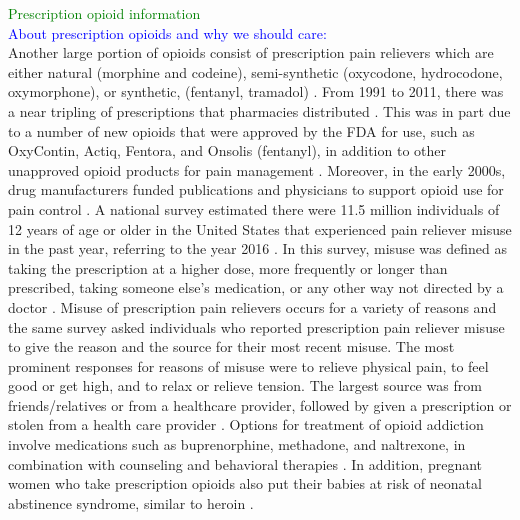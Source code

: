 \documentclass[12pt]{article}
\begin{document}
\textcolor{green}{Prescription opioid information} \\
\textcolor{blue}{About prescription opioids and why we should care:} \\
Another large portion of opioids consist of prescription pain relievers which are either natural (morphine and codeine), semi-synthetic (oxycodone, hydrocodone, oxymorphone), or synthetic, (fentanyl, tramadol) \cite{CDC3, TNMentalHealth2}. From 1991 to 2011, there was a near tripling of prescriptions that pharmacies distributed \cite{NIDA1}. This was in part due to a number of new opioids that were approved by the FDA for use, such as OxyContin, Actiq, Fentora, and Onsolis (fentanyl), in addition to other unapproved opioid products for pain management \cite{FDA1}. Moreover, in the early 2000s, drug manufacturers funded publications and physicians to support opioid use for pain control \cite{Mandell}. A national survey estimated there were 11.5 million individuals of 12 years of age or older in the United States that experienced pain reliever misuse in the past year, referring to the year 2016 \cite{CDC2}. In this survey, misuse was defined as taking the prescription at a higher dose, more frequently or longer than prescribed, taking someone else's medication, or any other way not directed by a doctor \cite{SAMSHA3}. Misuse of prescription pain relievers occurs for a variety of reasons and the same survey asked individuals who reported prescription pain reliever misuse to give the reason and the source for their most recent misuse. The most prominent responses for reasons of misuse were to relieve physical pain, to feel good or get high, and to relax or relieve tension. The largest source was from friends/relatives or from a healthcare provider, followed by given a prescription or stolen from a health care provider \cite{CDC2}. Options for treatment of opioid addiction involve medications such as buprenorphine, methadone, and naltrexone, in combination with counseling and behavioral therapies \cite{SAMSHA1}. In addition, pregnant women who take prescription opioids also put their babies at risk of neonatal abstinence syndrome, similar to heroin \cite{CDC5}. 
\end{document}
